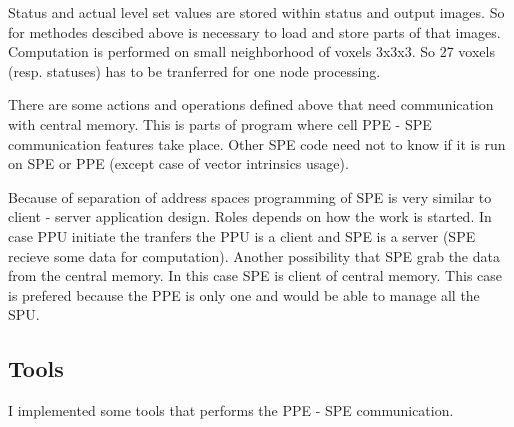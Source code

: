 Status and actual level set values are stored within status and output images.
So for methodes descibed above is necessary to load and store parts of that
images. Computation is performed on small neighborhood of voxels 3x3x3. So 27
voxels (resp. statuses) has to be tranferred for one node processing.

There are some actions and operations defined above that need communication
with central memory. This is parts of program where cell PPE - SPE communication
features take place. Other SPE code need not to know if it is run on SPE or PPE
(except case of vector intrinsics usage).

Because of separation of address spaces programming
of SPE is very similar to client - server application design. Roles depends on
how the work is started. In case PPU initiate the tranfers the PPU is a client
and SPE is a server (SPE recieve some data for computation). Another
possibility that SPE grab the data from the central memory. In this case SPE is
client of central memory. This case is prefered because the PPE is only one and
would be able to manage all the SPU.

\subsection{Tools}
I implemented some tools that performs the PPE - SPE communication.

